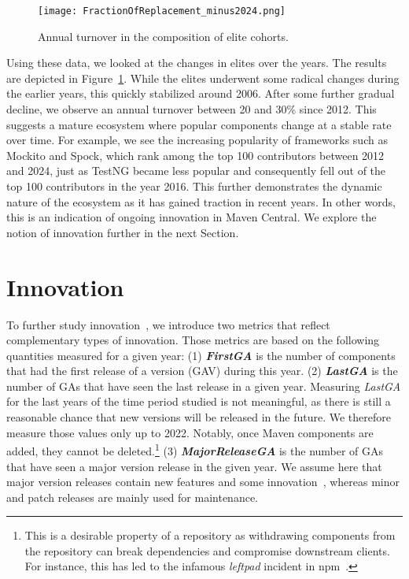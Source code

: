 \documentclass[10pt,conference]{IEEEtran}
\begin{document}
\begin{figure}
\centering
\texttt{[image: FractionOfReplacement\_minus2024.png]}
\caption{Annual turnover in the composition of elite cohorts.}
\label{fig:replacement}
\end{figure}

Using these data, we looked at the changes in elites over the years. The results are depicted in Figure~\ref{fig:replacement}.  While the elites underwent some radical changes during the earlier years, this quickly stabilized around 2006. After some further gradual decline, we observe an annual turnover between 20 and 30\% since 2012. This suggests a mature ecosystem where popular components change at a stable rate over time.
For example, we see the increasing popularity of frameworks such as Mockito and Spock, which rank among the top 100 contributors between 2012 and 2024, just as TestNG became less popular and consequently fell out of the top 100 contributors in the year 2016. This further demonstrates the dynamic nature of the ecosystem as it has gained traction in recent years. In other words, this is an indication of ongoing innovation in Maven Central. We explore the notion of innovation further in the next Section. 

\section{Innovation}
\label{section:innovation}

To further study innovation~\cite{OECD2018innov}, we introduce two metrics that reflect complementary types of innovation. Those metrics are based on the following quantities measured for a given year: (1) \textbf{\textit{FirstGA}} is the number of components that had the first release of a version (GAV) during this year. (2) \textbf{\textit{LastGA}} is the number of GAs that have seen the last release in a given year. Measuring \textit{LastGA} for the last years of the time period studied is not meaningful, as there is still a reasonable chance that new versions will be released in the future. We therefore measure those values only up to 2022. Notably, once Maven components are added, they cannot be deleted.\footnote{This is a desirable property of a repository as withdrawing components from the repository can break dependencies and compromise downstream clients. For instance, this has led to the infamous \textit{leftpad} incident in npm~\cite{mens2016ecosystemic}.} (3) \textbf{\textit{MajorReleaseGA}} is the number of GAs that have seen a major version release in the given year. We assume here that major version releases contain new features and some innovation~\cite{Brown2024}, whereas minor and patch releases are mainly used for maintenance. 
\end{document}
